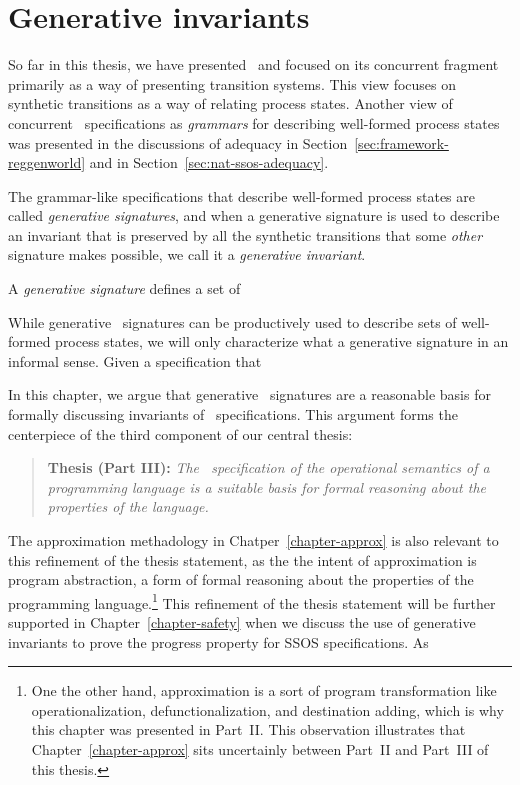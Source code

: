 \chapter{Generative invariants}
\label{chapter-gen}

So far in this thesis, we have presented \sls~and focused on its
concurrent fragment primarily as a way of presenting transition
systems. This view focuses on synthetic transitions as a way of
relating process states. Another view of concurrent
\sls~specifications as {\it grammars} for describing well-formed
process states was presented in the discussions of adequacy in
Section~\ref{sec:framework-reggenworld} and in
Section~\ref{sec:nat-ssos-adequacy}. 

The grammar-like specifications that describe well-formed process
states are called {\it generative signatures}, and when a generative
signature is used to describe an invariant that is preserved by all
the synthetic transitions that some {\it other} signature makes
possible, we call it a {\it generative invariant}. 

\begin{definition}
A {\em generative signature} defines a set of 
\end{definition}


While generative \sls~signatures can be productively used to describe
sets of well-formed process states, we will only characterize what a
generative signature in an informal sense. Given a specification that

In this chapter, we argue that generative \sls~signatures
are a reasonable basis for formally discussing invariants of
\sls~specifications. This argument forms the centerpiece of the
third component of our central thesis:

\smallskip
\begin{quote} 
  {\bf Thesis (Part III):} {\it The \sls~specification of the operational
    semantics of a programming language is a suitable basis for formal
    reasoning about the properties of the language.}
\end{quote} 
\smallskip 

\noindent
The approximation methadology in Chatper~\ref{chapter-approx} is also
relevant to this refinement of the thesis statement, as the the intent
of approximation is program abstraction, a form of formal reasoning
about the properties of the programming language.\footnote{One the
  other hand, approximation is a sort of program transformation like
  operationalization, defunctionalization, and destination adding,
  which is why this chapter was presented in Part~II. This observation
  illustrates that Chapter~\ref{chapter-approx} sits uncertainly
  between Part~II and Part~III of this thesis.} This refinement of the
thesis statement will be further supported in Chapter~\ref{chapter-safety}
when we discuss the use of generative invariants to prove the progress
property for SSOS specifications. As 






